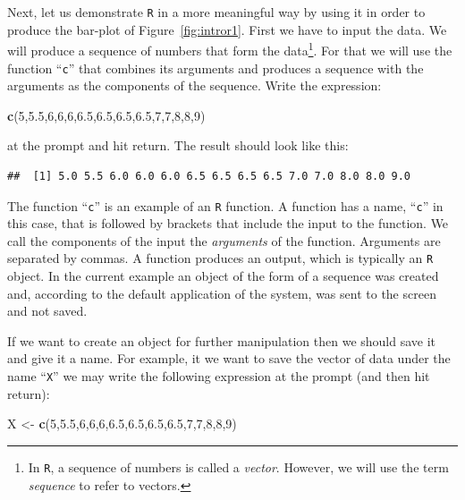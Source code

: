 \documentclass[]{krantz}
\makeatletter
\newenvironment{Shaded}{\begin{snugshade}}{\end{snugshade}}
\newcommand{\KeywordTok}[1]{\textcolor[rgb]{0.13,0.29,0.53}{\textbf{#1}}}
\newcommand{\DecValTok}[1]{\textcolor[rgb]{0.00,0.00,0.81}{#1}}
\newcommand{\FloatTok}[1]{\textcolor[rgb]{0.00,0.00,0.81}{#1}}
\newcommand{\StringTok}[1]{\textcolor[rgb]{0.31,0.60,0.02}{#1}}
\newcommand{\NormalTok}[1]{#1}
\newenvironment{kframe}{%
\medskip{}
\setlength{\fboxsep}{.8em}
 \def\at@end@of@kframe{}%
 \ifinner\ifhmode%
  \def\at@end@of@kframe{\end{minipage}}%
  \begin{minipage}{\columnwidth}%
 \fi\fi%
 \def\FrameCommand##1{\hskip\@totalleftmargin \hskip-\fboxsep
 \colorbox{shadecolor}{##1}\hskip-\fboxsep
     \hskip-\linewidth \hskip-\@totalleftmargin \hskip\columnwidth}%
 \MakeFramed {\advance\hsize-\width
   \@totalleftmargin\z@ \linewidth\hsize
   \@setminipage}}%
 {\par\unskip\endMakeFramed%
 \at@end@of@kframe}
\renewenvironment{Shaded}{\begin{kframe}}{\end{kframe}}
\theoremstyle{definition}
\theoremstyle{definition}
\theoremstyle{definition}
\theoremstyle{remark}
\makeatother
\begin{document}
Next, let us demonstrate \texttt{R} in a more meaningful way by using it
in order to produce the bar-plot of Figure~\ref{fig:intror1}. First we
have to input the data. We will produce a sequence of numbers that form
the data\footnote{In \texttt{R}, a sequence of numbers is called a
  \emph{vector}. However, we will use the term \emph{sequence} to refer
  to vectors.}. For that we will use the function ``\texttt{c}'' that
combines its arguments and produces a sequence with the arguments as the
components of the sequence. Write the expression:

\begin{Shaded}
\begin{Highlighting}[]
\KeywordTok{c}\NormalTok{(}\DecValTok{5}\NormalTok{,}\FloatTok{5.5}\NormalTok{,}\DecValTok{6}\NormalTok{,}\DecValTok{6}\NormalTok{,}\DecValTok{6}\NormalTok{,}\FloatTok{6.5}\NormalTok{,}\FloatTok{6.5}\NormalTok{,}\FloatTok{6.5}\NormalTok{,}\FloatTok{6.5}\NormalTok{,}\DecValTok{7}\NormalTok{,}\DecValTok{7}\NormalTok{,}\DecValTok{8}\NormalTok{,}\DecValTok{8}\NormalTok{,}\DecValTok{9}\NormalTok{)}
\end{Highlighting}
\end{Shaded}

at the prompt and hit return. The result should look like this:

\begin{verbatim}
##  [1] 5.0 5.5 6.0 6.0 6.0 6.5 6.5 6.5 6.5 7.0 7.0 8.0 8.0 9.0
\end{verbatim}

The function ``\texttt{c}'' is an example of an \texttt{R} function. A
function has a name, ``\texttt{c}'' in this case, that is followed by
brackets that include the input to the function. We call the components
of the input the \emph{arguments} of the function. Arguments are
separated by commas. A function produces an output, which is typically
an \texttt{R} object. In the current example an object of the form of a
sequence was created and, according to the default application of the
system, was sent to the screen and not saved.

If we want to create an object for further manipulation then we should
save it and give it a name. For example, it we want to save the vector
of data under the name ``\texttt{X}'' we may write the following
expression at the prompt (and then hit return):

\begin{Shaded}
\begin{Highlighting}[]
\NormalTok{X <-}\StringTok{ }\KeywordTok{c}\NormalTok{(}\DecValTok{5}\NormalTok{,}\FloatTok{5.5}\NormalTok{,}\DecValTok{6}\NormalTok{,}\DecValTok{6}\NormalTok{,}\DecValTok{6}\NormalTok{,}\FloatTok{6.5}\NormalTok{,}\FloatTok{6.5}\NormalTok{,}\FloatTok{6.5}\NormalTok{,}\FloatTok{6.5}\NormalTok{,}\DecValTok{7}\NormalTok{,}\DecValTok{7}\NormalTok{,}\DecValTok{8}\NormalTok{,}\DecValTok{8}\NormalTok{,}\DecValTok{9}\NormalTok{)}
\end{Highlighting}
\end{Shaded}
\end{document}
